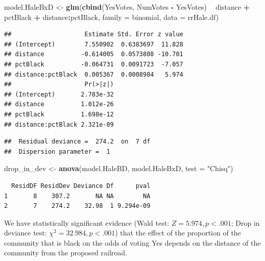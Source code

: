 \documentclass[
]{krantz}
\newenvironment{Shaded}{\begin{snugshade}}{\end{snugshade}}
\newcommand{\DataTypeTok}[1]{\textcolor[rgb]{0.27,0.27,0.27}{#1}}
\newcommand{\KeywordTok}[1]{\textcolor[rgb]{0.27,0.27,0.27}{\textbf{#1}}}
\newcommand{\NormalTok}[1]{#1}
\newcommand{\OperatorTok}[1]{\textcolor[rgb]{0.43,0.43,0.43}{\textbf{#1}}}
\newcommand{\StringTok}[1]{\textcolor[rgb]{0.5,0.5,0.5}{#1}}
\begin{document}
\begin{Shaded}
\begin{Highlighting}[]
\NormalTok{model.HaleBxD <-}\StringTok{ }\KeywordTok{glm}\NormalTok{(}\KeywordTok{cbind}\NormalTok{(YesVotes, NumVotes }\OperatorTok{-}\StringTok{ }\NormalTok{YesVotes) }\OperatorTok{~}
\StringTok{  }\NormalTok{distance }\OperatorTok{+}\StringTok{ }\NormalTok{pctBlack }\OperatorTok{+}\StringTok{ }\NormalTok{distance}\OperatorTok{:}\NormalTok{pctBlack, }
  \DataTypeTok{family =}\NormalTok{ binomial, }\DataTypeTok{data =}\NormalTok{ rrHale.df)}
\end{Highlighting}
\end{Shaded}

\begin{verbatim}
##                    Estimate Std. Error z value
## (Intercept)        7.550902  0.6383697  11.828
## distance          -0.614005  0.0573808 -10.701
## pctBlack          -0.064731  0.0091723  -7.057
## distance:pctBlack  0.005367  0.0008984   5.974
##                    Pr(>|z|)
## (Intercept)       2.783e-32
## distance          1.012e-26
## pctBlack          1.698e-12
## distance:pctBlack 2.321e-09
\end{verbatim}

\begin{verbatim}
##  Residual deviance =  274.2  on  7 df 
##  Dispersion parameter =  1
\end{verbatim}

\begin{Shaded}
\begin{Highlighting}[]
\NormalTok{drop_in_dev <-}\StringTok{ }\KeywordTok{anova}\NormalTok{(model.HaleBD, model.HaleBxD, }
                     \DataTypeTok{test =} \StringTok{"Chisq"}\NormalTok{)}
\end{Highlighting}
\end{Shaded}

\begin{verbatim}
  ResidDF ResidDev Deviance Df      pval
1       8    307.2       NA NA        NA
2       7    274.2    32.98  1 9.294e-09
\end{verbatim}

We have statistically significant evidence (Wald test: \(Z = 5.974, p<.001\); Drop in deviance test: \(\chi^2=32.984, p<.001\)) that the effect of the proportion of the community that is black on the odds of voting Yes depends on the distance of the community from the proposed railroad.
\end{document}
